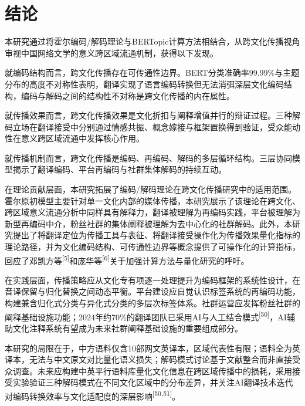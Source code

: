 \documentclass[12pt, a4paper]{article}
\newcommand{\citemark}[1]{\textsuperscript{[#1]}}
\begin{document}
\section{结论}

本研究通过将霍尔编码/解码理论与BERTopic计算方法相结合，从跨文化传播视角审视中国网络文学的意义跨区域流通机制，获得以下发现。

就编码结构而言，跨文化传播存在可传通性边界。BERT分类准确率99.99\%与主题分布的高度不对称性表明，翻译实现了语言编码转换但无法消弭深层文化编码结构，编码与解码之间的结构性不对称是跨文化传播的内在属性。

就传播效果而言，跨文化传播效果是文化折扣与阐释增值并行的辩证过程。三种解码立场在翻译接受中分别通过情感共振、概念嫁接与框架置换得到验证，受众能动性在意义跨区域流通中发挥核心作用。

就传播机制而言，跨文化传播是编码、再编码、解码的多层循环结构。三层协同模型揭示了翻译编码、平台再编码与社群集体解码的持续互动。

在理论贡献层面，本研究拓展了编码/解码理论在跨文化传播研究中的适用范围。霍尔原初模型主要针对单一文化内部的媒体传播，本研究展示了该理论在跨文化、跨区域意义流通分析中同样具有解释力，翻译被理解为再编码实践，平台被理解为新型再编码中介，粉丝社群的集体阐释被理解为去中心化的社群解码。此外，本研究提出了将翻译定位为传播工具与表征、将翻译接受操作化为传播效果量化指标的理论路径，并为文化编码结构、可传通性边界等概念提供了可操作化的计算指标，回应了邓凯方等\citemark{5}和庞华等\citemark{6}关于加强计算方法与量化研究的呼吁。

在实践层面，传播策略应从文化专有项逐一处理提升为编码框架的系统性设计，在音译保留与归化替换之间动态平衡。平台建设应自觉认识标签系统的再编码功能，构建兼含归化式分类与异化式分类的多层次标签体系。社群运营应发挥粉丝社群的阐释基础设施功能；2024年约70\%的翻译团队已采用AI与人工结合模式\citemark{50}，AI辅助文化注释系统有望成为未来社群阐释基础设施的重要组成部分。

本研究的局限在于，中方语料仅含10部网文英译本，区域代表性有限；语料全为英译本，无法与中文原文对比量化语义损失；解码模式讨论基于文献整合而非直接受众调查。未来应构建中英平行语料库量化文化信息在跨区域传播中的损耗，采用接受实验验证三种解码模式在不同文化区域中的分布差异，并关注AI翻译技术迭代对编码转换效率与文化适配度的深层影响\citemark{50,51}。

\end{document}
